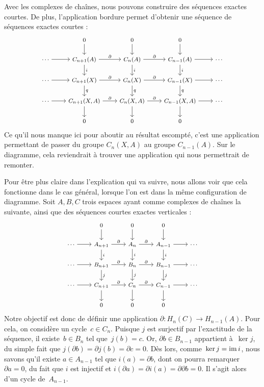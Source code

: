 Avec les complexes de chaînes, nous pouvons construire des séquences exactes courtes. De plus, l'application bordure permet d'obtenir une séquence de séquences exactes courtes : 
\[
\footnotesize
\begin{tikzcd}
&0\arrow[d]&0\arrow[d]&0\arrow[d]&\\
\cdots\arrow[r]&C_{n+1}(A)\arrow[r, "\partial"]\arrow[d,"i"]&C_n(A)\arrow[r, "\partial"]\arrow[d,"i"]&C_{n-1}(A)\arrow[r]\arrow[d,"i"]&\cdots\\
\cdots\arrow[r]&C_{n+1}(X)\arrow[r, "\partial"]\arrow[d,"q"]&C_n(X)\arrow[r, "\partial"]\arrow[d,"q"]&C_{n-1}(X)\arrow[r]\arrow[d,"q"]&\cdots\\
\cdots\arrow[r]&C_{n+1}(X,A)\arrow[r, "\partial"]\arrow[d]&C_n(X,A)\arrow[r, "\partial"]\arrow[d]&C_{n-1}(X,A)\arrow[r]\arrow[d]&\cdots\\
&0&0&0&
\end{tikzcd}\]
Ce qu'il nous manque ici pour aboutir au résultat escompté, c'est une application permettant de passer du groupe $C_n(X,A)$ au groupe $C_{n-1}(A)$. Sur le diagramme, cela reviendrait à trouver une application qui nous permettrait de remonter.

\bigskip Pour être plus claire dans l'explication qui va suivre, nous allons voir que cela fonctionne dans le cas général, lorsque l'on est dans la même configuration de diagramme. Soit $A,B,C$ trois espaces ayant comme complexes de chaînes la suivante, ainsi que des séquences courtes exactes verticales : 
\[
\footnotesize
\begin{tikzcd}
&0\arrow[d]&0\arrow[d]&0\arrow[d]&\\
\cdots\arrow[r]&A_{n+1}\arrow[r, "\partial"]\arrow[d,"i"]&A_n\arrow[r, "\partial"]\arrow[d,"i"]&A_{n-1}\arrow[r]\arrow[d,"i"]&\cdots\\
\cdots\arrow[r]&B_{n+1}\arrow[r, "\partial"]\arrow[d,"j"]&B_n\arrow[r, "\partial"]\arrow[d,"j"]&B_{n-1}\arrow[r]\arrow[d,"j"]&\cdots\\
\cdots\arrow[r]&C_{n+1}\arrow[r, "\partial"]\arrow[d]&C_n\arrow[r, "\partial"]\arrow[d]&C_{n-1}\arrow[r]\arrow[d]&\cdots\\
&0&0&0&
\end{tikzcd}\]Notre objectif est donc de définir une application $\partial:H_n(C)\to H_{n-1}(A)$. Pour cela, on considère un cycle~$ c\in C_n$. Puisque $j$ est surjectif par l'exactitude de la séquence, il existe~$b\in B_n$ tel que~$j(b)=c$. Or, $\partial b\in B_{n-1}$ appartient à~$\ker j$, du simple fait que $j(\partial b)=\partial j(b)=\partial c=0$. Dès lors, comme~${\ker j=\mathrm{im}\, i}$, nous savons qu'il existe $a\in A_{n-1}$ tel que $i(a)=\partial b$, dont on pourra remarquer~$\partial a=0$, du fait que $i$ est injectif et $i(\partial a)=\partial i(a)=\partial\partial b=0$. Il s'agit alors d'un cycle de~$A_{n-1}$.

